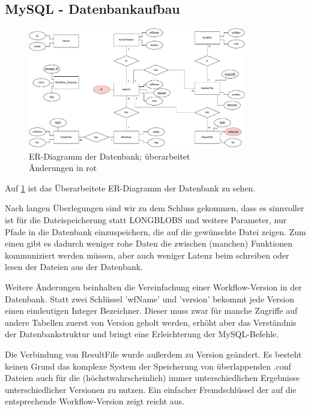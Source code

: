 \subsection{MySQL - Datenbankaufbau}

\begin{figure}[h]
	\centering
	\includegraphics[width=0.85\textwidth]{res/er_diagram.pdf} 
	\caption{ER-Diagramm der Datenbank; überarbeitet\\ Änderungen in rot}
	\label{fig:er_diagram}
\end{figure}

Auf \ref{fig:er_diagram} ist das Überarbeitete ER-Diagramm der Datenbank zu sehen.

Nach langen Überlegungen sind wir zu dem Schluss gekommen, dass es sinnvoller ist für die Dateispeicherung statt LONGBLOBS und weitere Parameter, nur Pfade in die Datenbank einzuspeichern, die auf die gewünschte Datei zeigen. Zum einen gibt es dadurch weniger rohe Daten die zwischen (manchen) Funktionen kommuniziert werden müssen, aber auch weniger Latenz beim schreiben oder lesen der Dateien aus der Datenbank.

Weitere Änderungen beinhalten die Vereinfachung einer Workflow-Version in der Datenbank. Statt zwei Schlüssel 'wfName' und 'version' bekommt jede Version einen eindeutigen Integer Bezeichner. Dieser muss zwar für manche Zugriffe auf andere Tabellen zuerst von Version geholt werden, erhöht aber das Verständnis der Datenbankstruktur und bringt eine Erleichterung der MySQL-Befehle.

Die Verbindung von ResultFile wurde außerdem zu Version geändert. Es besteht keinen Grund das komplexe System der Speicherung von überlappenden .conf Dateien auch für die (höchstwahrscheinlich) immer unterschiedlichen Ergebnisse unterschiedlicher Versionen zu nutzen. Ein einfacher Fremdschlüssel der auf die entsprechende Workflow-Version zeigt reicht aus.



